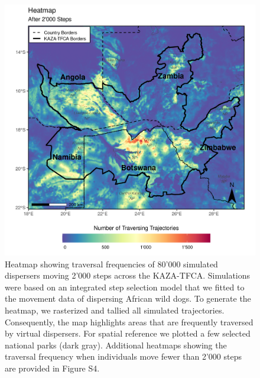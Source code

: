\documentclass[abstract=on,10pt,a4paper,bibliography=totocnumbered]{article}
\begin{document}
\begin{figure}
  \includegraphics[width=\textwidth]{99_Heatmap.png}
  \caption{Heatmap showing traversal frequencies of 80'000 simulated dispersers
  moving 2'000 steps across the KAZA-TFCA. Simulations were based on an
  integrated step selection model that we fitted to the movement data of
  dispersing African wild dogs. To generate the heatmap, we rasterized and
  tallied all simulated trajectories. Consequently, the map highlights areas
  that are frequently traversed by virtual dispersers. For spatial reference we
  plotted a few selected national parks (dark gray). Additional heatmaps showing
  the traversal frequency when individuals move fewer than 2'000 steps are
  provided in Figure S4.}
  \label{Heatmap}
\end{figure}
\end{document}
